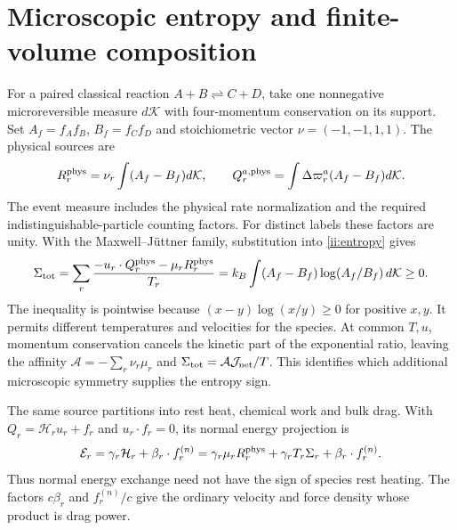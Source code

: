 \section{Microscopic entropy and finite-volume composition}

For a paired classical reaction $A+B\rightleftharpoons C+D$, take one nonnegative microreversible measure $d\mathcal K$ with four-momentum conservation on its support. Set $A_f=f_Af_B$, $B_f=f_Cf_D$ and stoichiometric vector $\nu=(-1,-1,1,1)$. The physical sources are
\begin{equation}
 R_r^{\rm phys}=\nu_r\int(A_f-B_f)d\mathcal K,
 \qquad Q_r^{a,\rm phys}=\int\Delta\varpi_r^a(A_f-B_f)d\mathcal K.
 \label{ii:paired_sources}
\end{equation}
The event measure includes the physical rate normalization and the required indistinguishable-particle counting factors. For distinct labels these factors are unity. With the Maxwell--J\"uttner family, substitution into \eqref{ii:entropy} gives
\begin{equation}
 \Sigma_{\rm tot}=
 \sum_r\frac{-u_r\cdot Q_r^{\rm phys}-\mu_rR_r^{\rm phys}}{T_r}
 =k_B\int(A_f-B_f)\log(A_f/B_f)\,d\mathcal K\ge0.
 \label{ii:entropy_production}
\end{equation}
The inequality is pointwise because $(x-y)\log(x/y)\ge0$ for positive $x,y$. It permits different temperatures and velocities for the species. At common $T,u$, momentum conservation cancels the kinetic part of the exponential ratio, leaving the affinity
$\mathcal A=-\sum_r\nu_r\mu_r$ and
$\Sigma_{\rm tot}=\mathcal A\mathcal J_{\rm net}/T$.
This identifies which additional microscopic symmetry supplies the entropy sign.

The same source partitions into rest heat, chemical work and bulk drag. With $Q_r=\mathcal H_ru_r+f_r$ and $u_r\cdot f_r=0$, its normal energy projection is
\begin{equation}
 \mathcal E_r=\gamma_r\mathcal H_r+\beta_r\cdot f_r^{(n)}
 =\gamma_r\mu_rR_r^{\rm phys}
   +\gamma_rT_r\Sigma_r+\beta_r\cdot f_r^{(n)}.
 \label{ii:heat_chemistry_drag}
\end{equation}
Thus normal energy exchange need not have the sign of species rest heating. The factors $c\beta_r$ and $f_r^{(n)}/c$ give the ordinary velocity and force density whose product is drag power.

